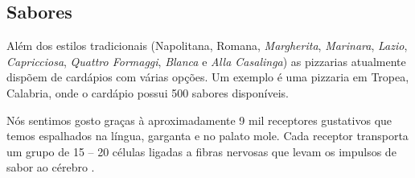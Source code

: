 \subsection{Sabores}

Além dos estilos tradicionais (Napolitana, Romana, \textsl{Margherita}, 
\textsl{Marinara}, 
\textsl{Lazio}, \textsl{Capricciosa}, \textsl{Quattro Formaggi}, \textsl{Blanca} 
e \textsl{Alla Casalinga}) as pizzarias atualmente dispõem de cardápios
com várias opções.  Um exemplo é uma pizzaria em Tropea, Calabria, onde
o cardápio possui 500 sabores disponíveis.

Nós sentimos gosto graças à aproximadamente 9 mil receptores gustativos que 
temos espalhados na língua, garganta e no palato mole.  Cada receptor
transporta um grupo de 15 -- 20 células ligadas a fibras nervosas
que levam os impulsos de sabor ao cérebro \cite{Sabor}.

